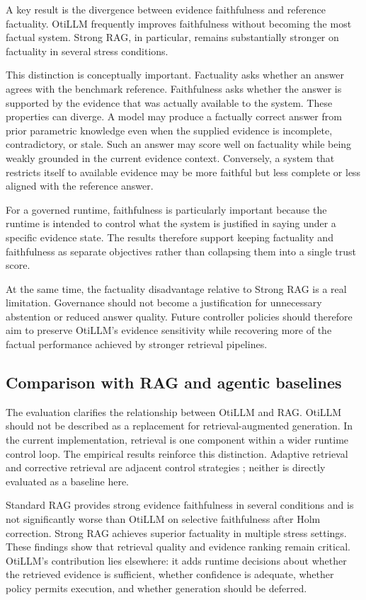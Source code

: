 \documentclass[manuscript, screen, review]{jair}
\begin{document}
A key result is the divergence between evidence faithfulness and reference factuality. OtiLLM frequently improves faithfulness without becoming the most factual system. Strong RAG, in particular, remains substantially stronger on factuality in several stress conditions.

This distinction is conceptually important. Factuality asks whether an answer agrees with the benchmark reference. Faithfulness asks whether the answer is supported by the evidence that was actually available to the system. These properties can diverge. A model may produce a factually correct answer from prior parametric knowledge even when the supplied evidence is incomplete, contradictory, or stale. Such an answer may score well on factuality while being weakly grounded in the current evidence context. Conversely, a system that restricts itself to available evidence may be more faithful but less complete or less aligned with the reference answer.

For a governed runtime, faithfulness is particularly important because the runtime is intended to control what the system is justified in saying under a specific evidence state. The results therefore support keeping factuality and faithfulness as separate objectives rather than collapsing them into a single trust score.

At the same time, the factuality disadvantage relative to Strong RAG is a real limitation. Governance should not become a justification for unnecessary abstention or reduced answer quality. Future controller policies should therefore aim to preserve OtiLLM's evidence sensitivity while recovering more of the factual performance achieved by stronger retrieval pipelines.

\subsection{Comparison with RAG and agentic baselines}

The evaluation clarifies the relationship between OtiLLM and RAG. OtiLLM should not be described as a replacement for retrieval-augmented generation. In the current implementation, retrieval is one component within a wider runtime control loop. The empirical results reinforce this distinction. Adaptive retrieval and corrective retrieval are adjacent control strategies \citep{jeong2024adaptive,yan2024crag}; neither is directly evaluated as a baseline here.

Standard RAG provides strong evidence faithfulness in several conditions and is not significantly worse than OtiLLM on selective faithfulness after Holm correction. Strong RAG achieves superior factuality in multiple stress settings. These findings show that retrieval quality and evidence ranking remain critical. OtiLLM's contribution lies elsewhere: it adds runtime decisions about whether the retrieved evidence is sufficient, whether confidence is adequate, whether policy permits execution, and whether generation should be deferred.
\end{document}
